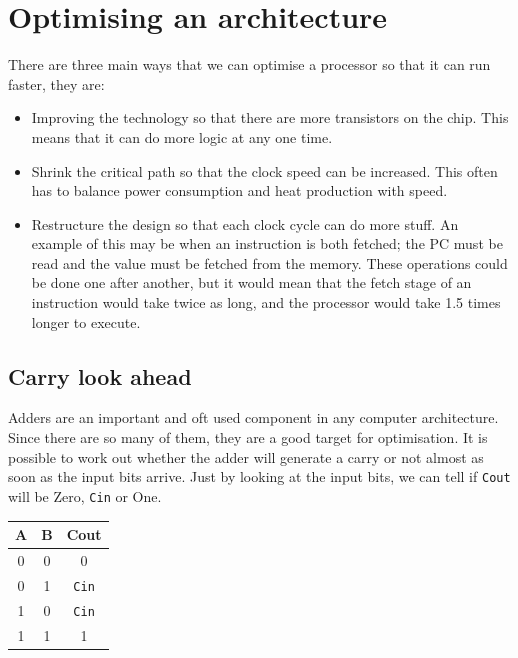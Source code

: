 \section{Optimising an architecture}

There are three main ways that we can optimise a processor so that it can run
faster, they are:

\begin{itemize}
	
	\item Improving the technology so that there are more transistors on the
	chip. This means that it can do more logic at any one time.

	\item Shrink the critical path so that the clock speed can be increased.
	This often has to balance power consumption and heat production with
	speed.

	\item Restructure the design so that each clock cycle can do more stuff.
	An example of this may be when an instruction is both fetched; the PC
	must be read and the value must be fetched from the memory. These
	operations could be done one after another, but it would mean that the
	fetch stage of an instruction would take twice as long, and the
	processor would take 1.5 times longer to execute.

\end{itemize}


\subsection{Carry look ahead}

Adders are an important and oft used component in any computer architecture.
Since there are so many of them, they are a good target for optimisation. It is
possible to work out whether the adder will generate a carry or not almost as
soon as the input bits arrive. Just by looking at the input bits, we can tell if
{\tt Cout} will be Zero, {\tt Cin} or One.

\begin{center}
	\begin{tabular}{|c c|c|}
		\hline
		{\bf A} & {\bf B} & {\bf Cout}\\ \hline
		0 & 0 & 0\\
		0 & 1 & {\tt Cin}\\
		1 & 0 & {\tt Cin}\\
		1 & 1 & 1\\
		\hline
	\end{tabular}
\end{center}

